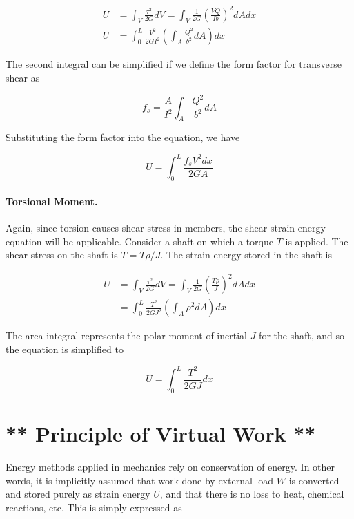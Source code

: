 \documentclass[
fontsize=10pt,
a4paper,
twosides=false,
open=any,
svgnames,
]{kaobook} %
\begin{document}
\begin{align*}
  U &= \int_V \frac{\tau^2}{2G} dV = \int_V \frac{1}{2G} \left( \frac{VQ}{Ib} \right)^2 dA dx \\
  U &= \int_0^L \frac{V^2}{2GI^2} \left( \int_A \frac{Q^2}{b^2} dA \right) dx
\end{align*}

The second integral can be simplified if we define the form factor for transverse shear as

\begin{equation}
  f_s = \frac{A}{I^2} \int_A \frac{Q^2}{b^2} dA
\end{equation}

Substituting the form factor into the equation, we have

\begin{equation}
  U = \int_0^L \frac{f_s V^2 dx}{2GA}
\end{equation}

\paragraph{Torsional Moment.}

Again, since torsion causes shear stress in members, the shear strain energy equation will be applicable. Consider a shaft on which a torque $T$ is applied. The shear stress on the shaft is $T = T \rho / J$. The strain energy stored in the shaft is

\begin{align*}
  U &= \int_V \frac{\tau^2}{2G} dV = \int_V \frac{1}{2G} \left( \frac{T \rho}{J} \right)^2 dA dx \\
    &= \int_0^L \frac{T^2}{2GJ^2} \left( \int_A \rho^2 dA \right) dx
\end{align*}

The area integral represents the polar moment of inertial $J$ for the shaft, and so the equation is simplified to

\begin{equation}
  U = \int_0^L \frac{T^2}{2GJ} dx
\end{equation}

\section{** Principle of Virtual Work **}

Energy methods applied in mechanics rely on conservation of energy. In other words, it is implicitly assumed that work done by external load $W$ is converted and stored purely as strain energy $U$, and that there is no loss to heat, chemical reactions, etc. This is simply expressed as
\end{document}
